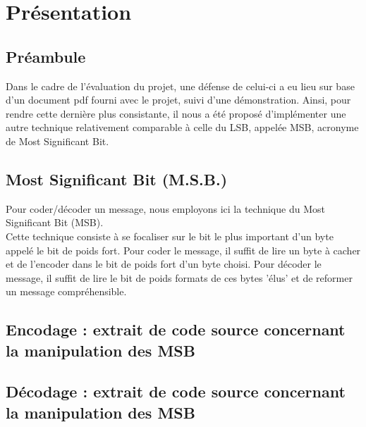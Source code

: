 \section{Présentation}

\subsection{Préambule}
Dans le cadre de l'évaluation du projet, une défense de celui-ci a eu lieu sur base d'un document pdf 
fourni avec le projet, suivi d'une démonstration.
Ainsi, pour rendre cette dernière plus consistante, il nous a été proposé d'implémenter une autre technique relativement 
comparable à celle du LSB, appelée MSB, acronyme de Most Significant Bit.

\subsection{Most Significant Bit (M.S.B.)}
Pour coder/décoder un message, nous employons ici la technique du Most Significant Bit (MSB). \\
Cette technique consiste à se focaliser sur le bit le plus important d'un byte appelé le bit de poids fort.
Pour coder le message, il suffit de lire un byte à cacher et de l'encoder dans le bit de poids fort d'un byte choisi.
Pour décoder le message, il suffit de lire le bit de poids formats de ces bytes 'élus' et de reformer un message compréhensible.

\subsection{Encodage : extrait de code source concernant la manipulation des MSB}


\newpage
\subsection{Décodage : extrait de code source concernant la manipulation des MSB}



